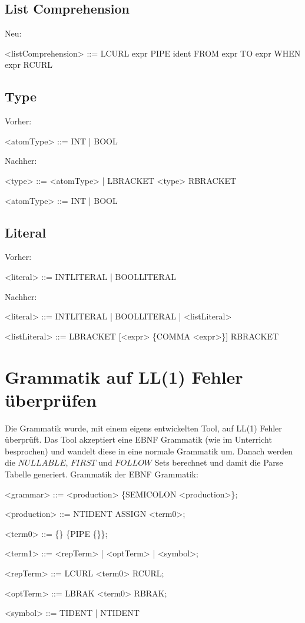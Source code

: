 \documentclass[a4paper,notitlepage,oneside]{article}
\begin{document}
\subsection{List Comprehension}
Neu:
\begin{grammar}
<listComprehension> ::=  LCURL expr PIPE ident FROM expr TO expr WHEN expr RCURL
\end{grammar}

\subsection{Type}
Vorher:
\begin{grammar}
<atomType> ::= INT | BOOL
\end{grammar}
Nachher:
\begin{grammar}
<type> ::=  <atomType> | LBRACKET <type> RBRACKET

<atomType> ::= INT | BOOL
\end{grammar}

\subsection{Literal}
Vorher:
\begin{grammar}
<literal> ::= INTLITERAL | BOOLLITERAL
\end{grammar}
Nachher:
\begin{grammar}
<literal> ::= INTLITERAL | BOOLLITERAL | <listLiteral>

<listLiteral> ::= LBRACKET [<expr> \{COMMA <expr>\}] RBRACKET
\end{grammar}
\newpage

\section{Grammatik auf LL(1) Fehler überprüfen}
Die Grammatik wurde, mit einem eigens entwickelten Tool, auf LL(1) Fehler überprüft. Das Tool akzeptiert eine EBNF Grammatik (wie im Unterricht besprochen) und wandelt diese in eine normale Grammatik um. Danach werden die $NULLABLE$, $FIRST$ und $FOLLOW$ Sets berechnet und damit die Parse Tabelle generiert.
\newline
\newline
Grammatik der EBNF Grammatik:
\begin{grammar}
<grammar> ::= <production> \{SEMICOLON <production>\};

<production> ::= NTIDENT ASSIGN <term0>;

<term0> ::= \{<term1>\} \{PIPE \{<term1>\}\};

<term1> ::= <repTerm> | <optTerm> | <symbol>;

<repTerm> ::= LCURL <term0> RCURL;

<optTerm> ::= LBRAK <term0> RBRAK;

<symbol> ::= TIDENT | NTIDENT
\end{grammar}
\end{document}
